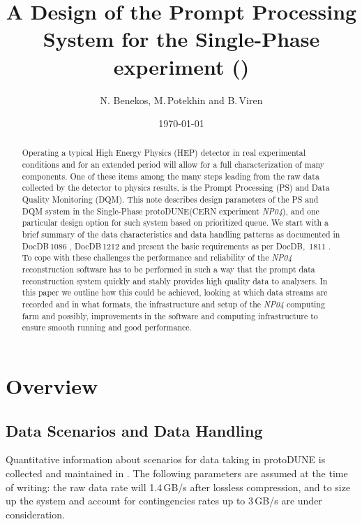 \documentclass[pdftex,12pt,letter]{article}
\title{A Design of the Prompt Processing System for the Single-Phase \pd experiment (\expname)}
\date{\today}
\author{N. Benekos, M.\,Potekhin and B.\,Viren}
\newcommand{\pd}{protoDUNE\xspace}
\newcommand{\expname}{\textit{NP04}\xspace}
\begin{document}
\maketitle

\begin{abstract}
\noindent  
Operating a typical High Energy Physics (HEP)  detector in real experimental conditions and for an extended period will allow for a full characterization of many components. One of these items among the many steps leading from the raw data collected
by the detector to physics results, is the Prompt Processing (PS) and Data Quality Monitoring (DQM). This note describes design parameters of
the PS and DQM system in the Single-Phase \pd (CERN experiment \expname), and one particular design option for such system
based on prioritized queue. We start with a brief summary of the data characteristics and data handling patterns as documented in DocDB\,1086 \cite{docdb1086}, DocDB\,1212 \cite{docdb1212} and present the basic requirements as per  DocDB,\ 1811 \cite{docdb1811}. 
To cope with these challenges the performance and reliability of the \expname reconstruction software has to be performed in such a way that the prompt data reconstruction system quickly and stably provides high quality data to analysers. 
In this paper we outline how this could be achieved, looking at which data streams are recorded and in what formats, the infrastructure and setup of the \expname  computing farm and possibly, improvements in the software and computing infrastructure to ensure smooth running and good performance.
\end{abstract}


\section{Overview}
\subsection{Data Scenarios and Data Handling}
\label{sec:rawdata}
Quantitative information about scenarios for data taking in \pd is collected and maintained in \cite{docdb1086}. The following parameters
are assumed at the time of writing: the raw data rate will 1.4\,GB/s after lossless compression, and to size up the system and account for contingencies rates up to 3\,GB/s are under consideration.
\end{document}
